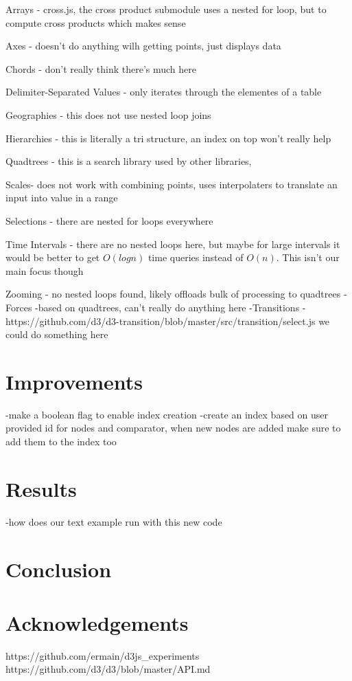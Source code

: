 \documentclass[a4paper]{article}
\begin{document}
Arrays - cross.js, the cross product submodule uses a nested for loop, but to compute cross products which makes sense

Axes - doesn't do anything wilh getting points, just displays data

Chords - don't really think there's much here

Delimiter-Separated Values - only iterates through the elementes of a table

Geographies - this does not use nested loop joins

Hierarchies - this is literally a tri structure, an index on top won't really help

Quadtrees - this is a search library used by other libraries, 

Scales- does not work with combining points, uses interpolaters to translate an input into value in a range

Selections - there are nested for loops everywhere

Time Intervals - there are no nested loops here, but maybe for large intervals it would be better to get $O(logn)$ time queries instead of $O(n)$. This isn't our main focus though

Zooming - no nested loops found, likely offloads bulk of processing to quadtrees
-Forces -based on quadtrees, can't really do anything here
-Transitions - https://github.com/d3/d3-transition/blob/master/src/transition/select.js we could do something here

\section{Improvements}
-make a boolean flag to enable index creation
-create an index based on user provided id for nodes and comparator, when new nodes are added make sure to add them to the index too
\section{Results}
-how does our text example run with this new code
\section{Conclusion}

\section{Acknowledgements}


\begin{thebibliography}{9}
 https://github.com/ermain/d3js\_experiments
 https://github.com/d3/d3/blob/master/API.md
\end{thebibliography}

\end{document}
